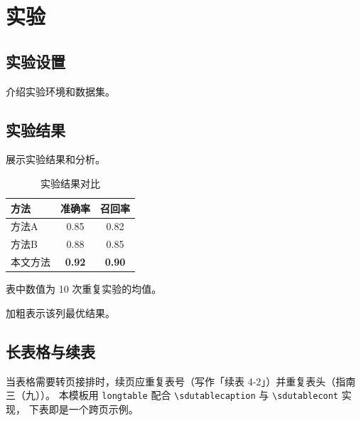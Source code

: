 
\chapter{实验}

\section{实验设置}

介绍实验环境和数据集。

\section{实验结果}

展示实验结果和分析。

\begin{table}[htbp]
  \centering
  \caption{实验结果对比}
  \begin{tabular}{lcc}
    \toprule
    方法 & 准确率 & 召回率 \\
    \midrule
    方法A & 0.85 & 0.82 \\
    方法B & 0.88 & 0.85 \\
    本文方法 & \textbf{0.92} & \textbf{0.90} \\
    \bottomrule
  \end{tabular}
  \begin{sdutablenotes}
    \item 表中数值为 10 次重复实验的均值。
    \item 加粗表示该列最优结果。
  \end{sdutablenotes}
\end{table}

\section{长表格与续表}

当表格需要转页接排时，续页应重复表号（写作「续表 4-2」）并重复表头（指南三（九））。
本模板用 \texttt{longtable} 配合 \verb|\sdutablecaption| 与 \verb|\sdutablecont| 实现，
下表即是一个跨页示例。

